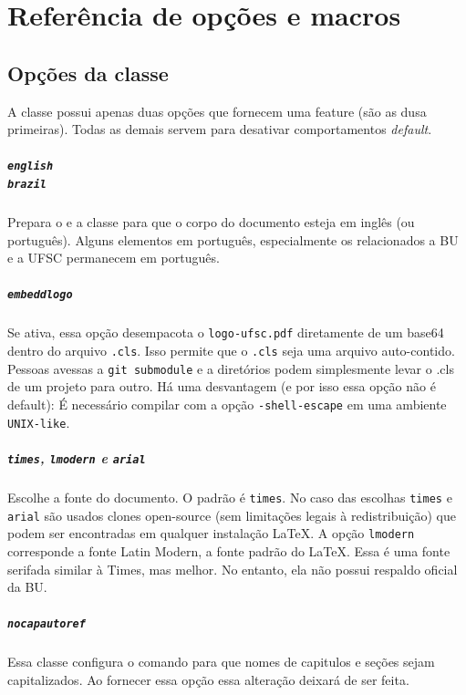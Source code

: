 \documentclass[english,embeddedlogo]{../ufsc-thesis-rn46-2019}
\begin{document}
\chapter{Referência de opções e macros}
\label{ch:ref}

\section{Opções da classe}

A classe possui apenas duas opções que fornecem uma feature (são as dusa primeiras). Todas as demais servem para desativar comportamentos \textit{default}.

\paragraph*{\texttt{english} \\
            \texttt{brazil}}
Prepara o \abnTeX e a classe para que o corpo do documento esteja em inglês (ou português). Alguns elementos em português, especialmente os relacionados a BU e a UFSC permanecem em português.

\paragraph*{\texttt{embeddlogo}} Se ativa, essa opção desempacota o \texttt{logo-ufsc.pdf} diretamente de um base64 dentro do arquivo \texttt{.cls}. Isso permite que o \texttt{.cls} seja uma arquivo auto-contido. Pessoas avessas a \texttt{git submodule} e a diretórios podem simplesmente levar o .cls de um projeto para outro. Há uma desvantagem (e por isso essa opção não é default): É necessário compilar com a opção \texttt{-shell-escape} em uma ambiente \texttt{UNIX-like}.

\paragraph*{\texttt{times}, \texttt{lmodern} e \texttt{arial}} Escolhe a fonte do documento. O padrão é \texttt{times}. No caso das escolhas \texttt{times} e \texttt{arial} são usados clones open-source (sem limitações legais à redistribuição) que podem ser encontradas em qualquer instalação \LaTeX. A opção \texttt{lmodern} corresponde a fonte Latin Modern, a fonte padrão do \LaTeX. Essa é uma fonte serifada similar à Times, mas melhor. No entanto, ela não possui respaldo oficial da BU.

\paragraph*{\texttt{nocapautoref}} Essa classe configura o comando \mt{\autoref} para que nomes de capitulos e seções sejam capitalizados. Ao fornecer essa opção essa alteração deixará de ser feita.
\end{document}
